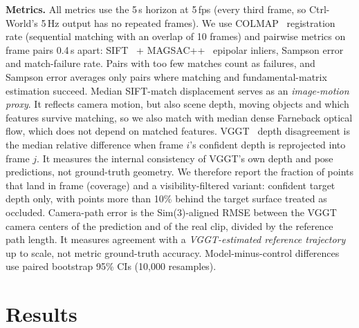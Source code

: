 \documentclass{article}
\begin{document}
\textbf{Metrics.} All metrics use the 5\,s horizon at 5\,fps (every third frame, so Ctrl-World's 5\,Hz
output has no repeated frames). We use COLMAP~\citep{schonberger2016sfm} registration rate (sequential
matching with an overlap of 10 frames) and pairwise metrics on frame pairs 0.4\,s apart:
SIFT~\citep{lowe2004sift} + MAGSAC++~\citep{barath2020magsacpp} epipolar inliers, Sampson error and
match-failure rate. Pairs with too few matches count as failures, and Sampson
error averages only pairs where matching and fundamental-matrix estimation succeed. Median SIFT-match
displacement serves as an \emph{image-motion proxy}. It reflects camera motion, but also scene depth,
moving objects and which features survive matching, so we also match with median dense
Farneback optical flow, which does not depend on matched features. VGGT~\citep{wang2025vggt} depth disagreement is the
median relative difference when frame $i$'s confident depth is reprojected into frame $j$. It
measures the internal consistency of VGGT's own depth and pose predictions, not ground-truth
geometry. We therefore report the fraction of points that land in frame (coverage) and a
visibility-filtered variant: confident target depth only, with points more than 10\% behind the
target surface treated as occluded. Camera-path error is the Sim(3)-aligned RMSE between the VGGT
camera centers of the prediction and of the real clip, divided by the reference path length. It
measures agreement with a \emph{VGGT-estimated reference trajectory} up to scale, not metric
ground-truth accuracy. Model-minus-control differences use paired bootstrap 95\% CIs (10,000
resamples).

\section{Results}
\begin{table}[t]
\centering
\scriptsize
\setlength{\tabcolsep}{3pt}
\resizebox{\linewidth}{!}{}
\vspace{4pt}
\caption{5\,s horizon, 25 clips common to all conditions, mean $\pm$ s.e.m. Motion: image-motion proxy
(px). Reg.: COLMAP registration rate. Fail: share of 0.4\,s frame pairs that fail to match. Sampson
in px. VGGT: depth disagreement. Cov.: fraction of reprojected points in frame. Path: camera-path
error vs.\ the VGGT-estimated reference (references: frozen camera 0.175, real path of a different
clip 0.115). Valid clips per metric are 22--25.}
\label{tab:main}
\end{table}
\end{document}
